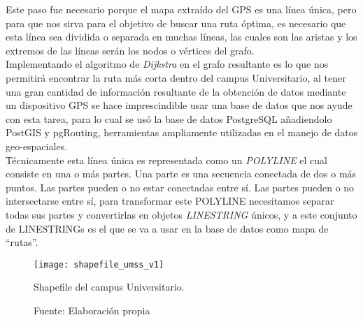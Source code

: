 
 Este paso fue necesario porque el mapa extraído del GPS es una línea única, pero para que nos sirva para el objetivo de buscar una ruta óptima, es necesario que esta línea sea dividida o separada en muchas líneas, las cuales son las aristas y los extremos de las líneas serán los nodos o vértices del grafo.\\

 Implementando el algoritmo de \emph{Dijkstra} en el grafo resultante es lo que nos permitir\'a encontrar la ruta más corta dentro del campus Universitario, al tener una gran cantidad de información resultante de la obtención de datos mediante un dispositivo GPS se hace imprescindible usar una base de datos que nos ayude con esta tarea, para lo cual se usó la base de datos PostgreSQL añadiendolo PostGIS y pgRouting, herramientas ampliamente utilizadas en el manejo de datos geo-espaciales.\\



 Técnicamente esta línea única es representada como un \emph{POLYLINE} el cual consiste en una o más partes. Una parte es una secuencia conectada de dos o más puntos. Las partes pueden o no estar conectadas entre sí. Las partes pueden o no intersectarse entre sí, para transformar este POLYLINE necesitamos separar todas sus partes y convertirlas en objetos \emph{LINESTRING} únicos, y a este conjunto de LINESTRINGs es el que se va a usar en la base de datos como mapa de ``rutas''.\cite{esri_shapefile}\\

 \begin{figure}[H]
   \begin{center}
     \texttt{[image: shapefile\_umss\_v1]}
     \caption{Shapefile del campus Universitario.}
     \label{fig:shapefile_umss_v1}
     \caption*{Fuente: Elaboración propia}
   \end{center}
 \end{figure}

